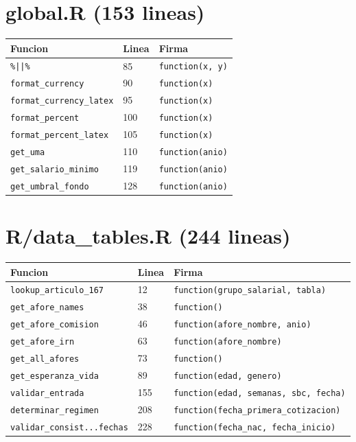 \documentclass[11pt, letterpaper, twoside]{report}
\begin{document}
\section{global.R (153 lineas)}

\begin{longtable}{lll}
\toprule
\textbf{Funcion} & \textbf{Linea} & \textbf{Firma} \\
\midrule
\texttt{\%||\%} & 85 & \texttt{function(x, y)} \\
\texttt{format\_currency} & 90 & \texttt{function(x)} \\
\texttt{format\_currency\_latex} & 95 & \texttt{function(x)} \\
\texttt{format\_percent} & 100 & \texttt{function(x)} \\
\texttt{format\_percent\_latex} & 105 & \texttt{function(x)} \\
\texttt{get\_uma} & 110 & \texttt{function(anio)} \\
\texttt{get\_salario\_minimo} & 119 & \texttt{function(anio)} \\
\texttt{get\_umbral\_fondo} & 128 & \texttt{function(anio)} \\
\bottomrule
\end{longtable}

\section{R/data\_tables.R (244 lineas)}

\begin{longtable}{lll}
\toprule
\textbf{Funcion} & \textbf{Linea} & \textbf{Firma} \\
\midrule
\texttt{lookup\_articulo\_167} & 12 & \texttt{function(grupo\_salarial, tabla)} \\
\texttt{get\_afore\_names} & 38 & \texttt{function()} \\
\texttt{get\_afore\_comision} & 46 & \texttt{function(afore\_nombre, anio)} \\
\texttt{get\_afore\_irn} & 63 & \texttt{function(afore\_nombre)} \\
\texttt{get\_all\_afores} & 73 & \texttt{function()} \\
\texttt{get\_esperanza\_vida} & 89 & \texttt{function(edad, genero)} \\
\texttt{validar\_entrada} & 155 & \texttt{function(edad, semanas, sbc, fecha)} \\
\texttt{determinar\_regimen} & 208 & \texttt{function(fecha\_primera\_cotizacion)} \\
\texttt{validar\_consist...fechas} & 228 & \texttt{function(fecha\_nac, fecha\_inicio)} \\
\bottomrule
\end{longtable}
\end{document}
